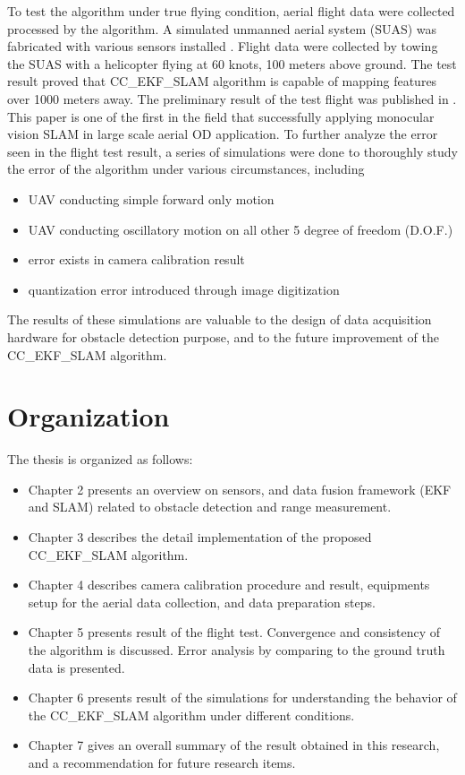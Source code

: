 To test the algorithm under true flying condition, aerial flight data
were collected processed by the algorithm. A simulated unmanned aerial
system (SUAS) was fabricated with various sensors installed . Flight
data were collected by towing the SUAS with a helicopter flying at 60
knots, 100 meters above ground. The test result proved that
CC\_EKF\_SLAM algorithm is capable of mapping features over 1000
meters away. The preliminary result of the test flight was published
in \cite{zhang_obstacle_2012}. This paper is one of the first in the
field that successfully applying monocular vision SLAM in large scale
aerial OD application. To further analyze the error seen in the flight
test result, a series of simulations were done to thoroughly study the
error of the algorithm under various circumstances, including
\begin{itemize}
\item UAV conducting simple forward only motion
\item UAV conducting oscillatory motion on all other 5 degree of
freedom (D.O.F.)
\item error exists in camera calibration result
\item quantization error introduced through image digitization 
\end{itemize}
The results of these simulations are valuable to the design of data
acquisition hardware for obstacle detection purpose, and to the future
improvement of the CC\_EKF\_SLAM algorithm.

\section{Organization}\label{section:Organization}
The thesis is organized as follows:

\begin{itemize}
  \item Chapter 2 presents an overview on sensors, and data fusion
  framework (EKF and SLAM) related to obstacle detection and range
  measurement.
  \item Chapter 3 describes the detail implementation of the proposed
  CC\_EKF\_SLAM algorithm.
  \item Chapter 4 describes camera calibration procedure and result,
  equipments setup for the aerial data collection, and data
  preparation steps.
  \item Chapter 5 presents result of the flight test. Convergence and
  consistency of the algorithm is discussed. Error analysis by
  comparing to the ground truth data is presented.
  \item Chapter 6 presents result of the simulations for understanding
  the behavior of the CC\_EKF\_SLAM algorithm under different
  conditions.
  \item Chapter 7 gives an overall summary of the result obtained in
  this research, and a recommendation for future research items.
\end{itemize}


